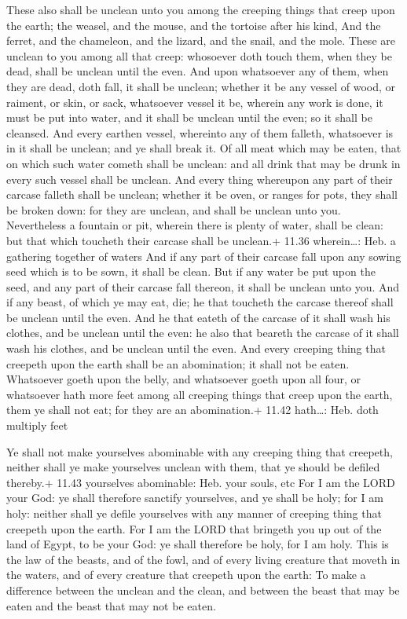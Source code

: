  These also shall be unclean unto you among the creeping
things that creep upon the earth; the weasel, and the mouse, and the
tortoise after his kind,  And the ferret, and the
chameleon, and the lizard, and the snail, and the mole. 
These are unclean to you among all that creep: whosoever doth touch
them, when they be dead, shall be unclean until the even. 
And upon whatsoever any of them, when they are dead, doth fall, it shall
be unclean; whether it be any vessel of wood, or raiment, or skin, or
sack, whatsoever vessel it be, wherein any work is done, it must be put
into water, and it shall be unclean until the even; so it shall be
cleansed.  And every earthen vessel, whereinto any of them
falleth, whatsoever is in it shall be unclean; and ye shall break it.
 Of all meat which may be eaten, that on which such water
cometh shall be unclean: and all drink that may be drunk in every such
vessel shall be unclean.  And every thing whereupon any
part of their carcase falleth shall be unclean; whether it be oven, or
ranges for pots, they shall be broken down: for they are unclean, and
shall be unclean unto you.  Nevertheless a fountain or pit,
wherein there is plenty of water, shall be clean: but that which
toucheth their carcase shall be unclean.+ 11.36 wherein\ldots: Heb. a
gathering together of waters  And if any part of their
carcase fall upon any sowing seed which is to be sown, it shall be
clean.  But if any water be put upon the seed, and any part
of their carcase fall thereon, it shall be unclean unto you.
 And if any beast, of which ye may eat, die; he that
toucheth the carcase thereof shall be unclean until the even.
 And he that eateth of the carcase of it shall wash his
clothes, and be unclean until the even: he also that beareth the carcase
of it shall wash his clothes, and be unclean until the even.
 And every creeping thing that creepeth upon the earth
shall be an abomination; it shall not be eaten.  Whatsoever
goeth upon the belly, and whatsoever goeth upon all four, or whatsoever
hath more feet among all creeping things that creep upon the earth, them
ye shall not eat; for they are an abomination.+ 11.42 hath\ldots: Heb.
doth multiply feet

 Ye shall not make yourselves abominable with any creeping
thing that creepeth, neither shall ye make yourselves unclean with them,
that ye should be defiled thereby.+ 11.43 yourselves abominable: Heb.
your souls, etc  For I am the LORD your God: ye shall
therefore sanctify yourselves, and ye shall be holy; for I am holy:
neither shall ye defile yourselves with any manner of creeping thing
that creepeth upon the earth.  For I am the LORD that
bringeth you up out of the land of Egypt, to be your God: ye shall
therefore be holy, for I am holy.  This is the law of the
beasts, and of the fowl, and of every living creature that moveth in the
waters, and of every creature that creepeth upon the earth:
 To make a difference between the unclean and the clean,
and between the beast that may be eaten and the beast that may not be
eaten.

